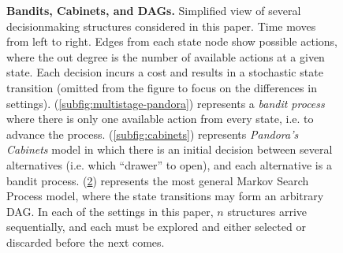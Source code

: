 \begin{figure}
\begin{subfigure}[b]{0.2\textwidth}
		\subcaption{}\label{subfig:pandora-full-tree}
	\end{subfigure}
	\caption{\textbf{Bandits, Cabinets, and DAGs.}
		Simplified view of several decisionmaking structures considered in this paper.
		Time moves from left to right.
        Edges from each state node show possible actions, where the out degree is the number of available actions at a given state.
		Each decision incurs a cost and results in a stochastic state transition (omitted from the figure to focus on the differences in settings).
		(\ref{subfig:multistage-pandora}) represents a \emph{bandit process} where there is only one available action from every state, i.e. to advance the process.
		(\ref{subfig:cabinets}) represents \emph{Pandora's Cabinets} model in which there is an initial decision between several alternatives (i.e. which ``drawer'' to open), and each alternative is a bandit process.
		(\ref{subfig:pandora-full-tree}) represents the most general Markov Search Process model, where the state transitions may form an arbitrary DAG.
		In each of the settings in this paper, $n$ structures arrive sequentially, and each must be explored and either selected or discarded before the next comes.
	}
\end{figure}
